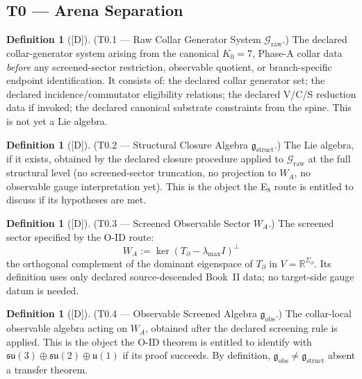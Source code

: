 \documentclass[12pt,oneside]{amsbook}
\theoremstyle{plain}
\theoremstyle{definition}
\newtheorem{definition}[theorem]{Definition}
\theoremstyle{remark}
\newcommand{\status}[1]{\textup{[#1]}}
\begin{document}
\subsection{T0 --- Arena Separation}

\begin{definition}[\status{D}]\label{def:g-raw}
\textup{(T0.1 --- Raw Collar Generator System $\mathcal{G}_{\mathrm{raw}}$.)}
The declared collar-generator system arising from the canonical
$K_0=7$, Phase-A collar data \emph{before} any screened-sector
restriction, observable quotient, or branch-specific endpoint
identification. It consists of: the declared collar generator set;
the declared incidence/commutator eligibility relations; the declared
V/C/S reduction data if invoked; the declared canonical substrate
constraints from the spine. This is not yet a Lie algebra.
\end{definition}

\begin{definition}[\status{D}]\label{def:g-struct}
\textup{(T0.2 --- Structural Closure Algebra $\mathfrak{g}_{\mathrm{struct}}$.)}
The Lie algebra, if it exists, obtained by the declared closure
procedure applied to $\mathcal{G}_{\mathrm{raw}}$ at the full
structural level (no screened-sector truncation, no projection to
$W_A$, no observable gauge interpretation yet). This is the object
the E$_8$ route is entitled to discuss if its hypotheses are met.
\end{definition}

\begin{definition}[\status{D}]\label{def:W-A-screened}
\textup{(T0.3 --- Screened Observable Sector $W_A$.)}
The screened sector specified by the O-ID route:
\[
 W_A := \ker(T_\partial - \lambda_{\max}I)^\perp
\]
the orthogonal complement of the dominant eigenspace of $T_\partial$
in $V = \mathbb{R}^{\Sigma_\partial}$. Its definition uses only
declared source-descended Book~II data; no target-side gauge datum
is needed.
\end{definition}

\begin{definition}[\status{D}]\label{def:g-obs}
\textup{(T0.4 --- Observable Screened Algebra $\mathfrak{g}_{\mathrm{obs}}$.)}
The collar-local observable algebra acting on $W_A$, obtained after
the declared screening rule is applied. This is the object the O-ID
theorem is entitled to identify with
$\mathfrak{su}(3)\oplus\mathfrak{su}(2)\oplus\mathfrak{u}(1)$
if its proof succeeds. By definition,
$\mathfrak{g}_{\mathrm{obs}} \neq \mathfrak{g}_{\mathrm{struct}}$
absent a transfer theorem.
\end{definition}
\end{document}
